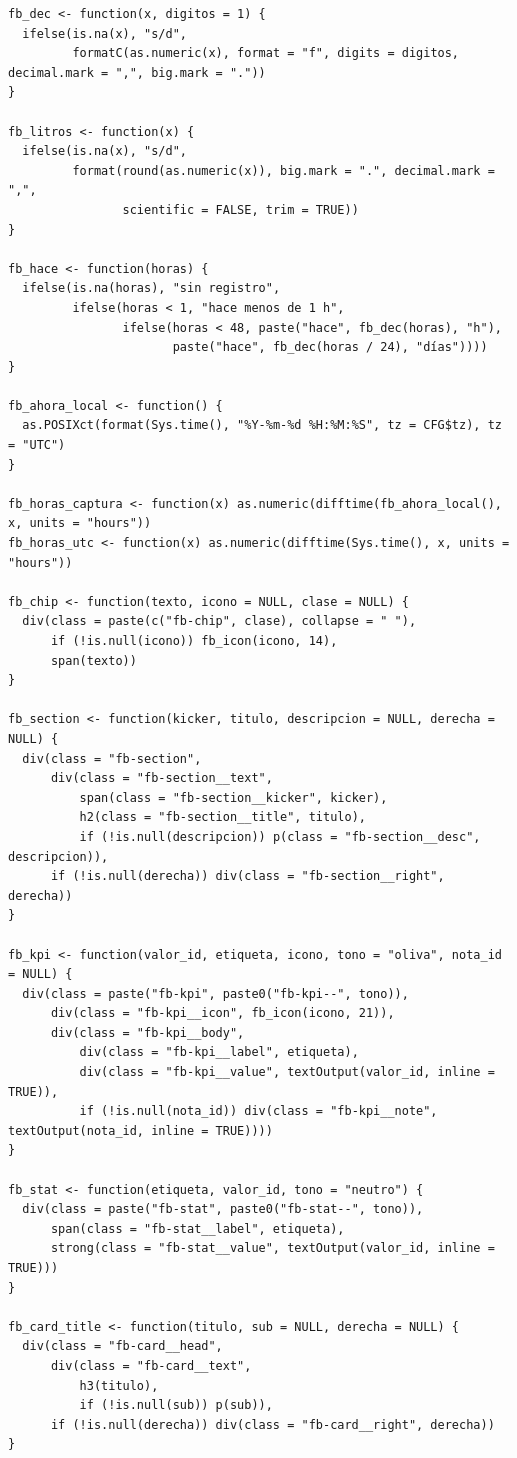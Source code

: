 \begin{lstlisting}[style=anexoR]
fb_dec <- function(x, digitos = 1) {
  ifelse(is.na(x), "s/d",
         formatC(as.numeric(x), format = "f", digits = digitos, decimal.mark = ",", big.mark = "."))
}

fb_litros <- function(x) {
  ifelse(is.na(x), "s/d",
         format(round(as.numeric(x)), big.mark = ".", decimal.mark = ",",
                scientific = FALSE, trim = TRUE))
}

fb_hace <- function(horas) {
  ifelse(is.na(horas), "sin registro",
         ifelse(horas < 1, "hace menos de 1 h",
                ifelse(horas < 48, paste("hace", fb_dec(horas), "h"),
                       paste("hace", fb_dec(horas / 24), "días"))))
}

fb_ahora_local <- function() {
  as.POSIXct(format(Sys.time(), "%Y-%m-%d %H:%M:%S", tz = CFG$tz), tz = "UTC")
}

fb_horas_captura <- function(x) as.numeric(difftime(fb_ahora_local(), x, units = "hours"))
fb_horas_utc <- function(x) as.numeric(difftime(Sys.time(), x, units = "hours"))

fb_chip <- function(texto, icono = NULL, clase = NULL) {
  div(class = paste(c("fb-chip", clase), collapse = " "),
      if (!is.null(icono)) fb_icon(icono, 14),
      span(texto))
}

fb_section <- function(kicker, titulo, descripcion = NULL, derecha = NULL) {
  div(class = "fb-section",
      div(class = "fb-section__text",
          span(class = "fb-section__kicker", kicker),
          h2(class = "fb-section__title", titulo),
          if (!is.null(descripcion)) p(class = "fb-section__desc", descripcion)),
      if (!is.null(derecha)) div(class = "fb-section__right", derecha))
}

fb_kpi <- function(valor_id, etiqueta, icono, tono = "oliva", nota_id = NULL) {
  div(class = paste("fb-kpi", paste0("fb-kpi--", tono)),
      div(class = "fb-kpi__icon", fb_icon(icono, 21)),
      div(class = "fb-kpi__body",
          div(class = "fb-kpi__label", etiqueta),
          div(class = "fb-kpi__value", textOutput(valor_id, inline = TRUE)),
          if (!is.null(nota_id)) div(class = "fb-kpi__note", textOutput(nota_id, inline = TRUE))))
}

fb_stat <- function(etiqueta, valor_id, tono = "neutro") {
  div(class = paste("fb-stat", paste0("fb-stat--", tono)),
      span(class = "fb-stat__label", etiqueta),
      strong(class = "fb-stat__value", textOutput(valor_id, inline = TRUE)))
}

fb_card_title <- function(titulo, sub = NULL, derecha = NULL) {
  div(class = "fb-card__head",
      div(class = "fb-card__text",
          h3(titulo),
          if (!is.null(sub)) p(sub)),
      if (!is.null(derecha)) div(class = "fb-card__right", derecha))
}


\end{lstlisting}
